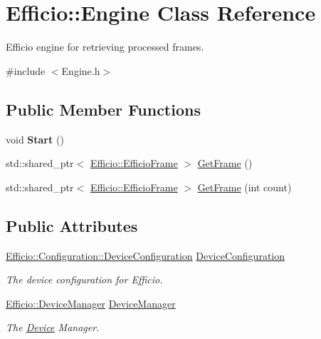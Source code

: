 \hypertarget{class_efficio_1_1_engine}{}\section{Efficio\+:\+:Engine Class Reference}
\label{class_efficio_1_1_engine}


Efficio engine for retrieving processed frames.  




{\ttfamily \#include $<$Engine.\+h$>$}

\subsection*{Public Member Functions}
\begin{DoxyCompactItemize}
\item 
void {\bfseries Start} ()\hypertarget{class_efficio_1_1_engine_a3b6e5c963c14df6e902f72df6a521fd1}{}\label{class_efficio_1_1_engine_a3b6e5c963c14df6e902f72df6a521fd1}

\item 
std\+::shared\+\_\+ptr$<$ \hyperlink{class_efficio_1_1_efficio_frame}{Efficio\+::\+Efficio\+Frame} $>$ \hyperlink{class_efficio_1_1_engine_a4f46a611516d157a32005a860128f9dc}{Get\+Frame} ()
\item 
std\+::shared\+\_\+ptr$<$ \hyperlink{class_efficio_1_1_efficio_frame}{Efficio\+::\+Efficio\+Frame} $>$ \hyperlink{class_efficio_1_1_engine_a9f81b122b1c2f768110675a79a842117}{Get\+Frame} (int count)
\end{DoxyCompactItemize}
\subsection*{Public Attributes}
\begin{DoxyCompactItemize}
\item 
\hyperlink{class_efficio_1_1_configuration_1_1_device_configuration}{Efficio\+::\+Configuration\+::\+Device\+Configuration} \hyperlink{class_efficio_1_1_engine_afbaba10c9c508bdcc16625a2e51a6148}{Device\+Configuration}\hypertarget{class_efficio_1_1_engine_afbaba10c9c508bdcc16625a2e51a6148}{}\label{class_efficio_1_1_engine_afbaba10c9c508bdcc16625a2e51a6148}

\begin{DoxyCompactList}\small\item\em The device configuration for Efficio. \end{DoxyCompactList}\item 
\hyperlink{class_efficio_1_1_device_manager}{Efficio\+::\+Device\+Manager} \hyperlink{class_efficio_1_1_engine_a09180d13f06e554000ada9f10c62065c}{Device\+Manager}\hypertarget{class_efficio_1_1_engine_a09180d13f06e554000ada9f10c62065c}{}\label{class_efficio_1_1_engine_a09180d13f06e554000ada9f10c62065c}

\begin{DoxyCompactList}\small\item\em The \hyperlink{class_efficio_1_1_device}{Device} Manager. \end{DoxyCompactList}\end{DoxyCompactItemize}


